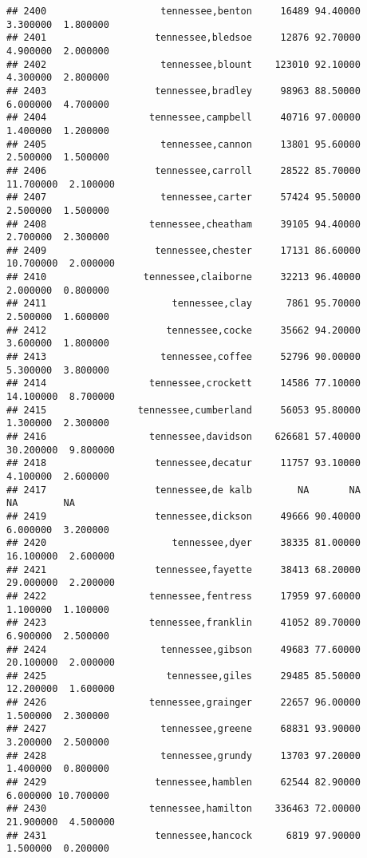 \documentclass[
]{article}
\begin{document}
\begin{verbatim}
## 2400                    tennessee,benton     16489 94.40000  3.300000  1.800000
## 2401                   tennessee,bledsoe     12876 92.70000  4.900000  2.000000
## 2402                    tennessee,blount    123010 92.10000  4.300000  2.800000
## 2403                   tennessee,bradley     98963 88.50000  6.000000  4.700000
## 2404                  tennessee,campbell     40716 97.00000  1.400000  1.200000
## 2405                    tennessee,cannon     13801 95.60000  2.500000  1.500000
## 2406                   tennessee,carroll     28522 85.70000 11.700000  2.100000
## 2407                    tennessee,carter     57424 95.50000  2.500000  1.500000
## 2408                  tennessee,cheatham     39105 94.40000  2.700000  2.300000
## 2409                   tennessee,chester     17131 86.60000 10.700000  2.000000
## 2410                 tennessee,claiborne     32213 96.40000  2.000000  0.800000
## 2411                      tennessee,clay      7861 95.70000  2.500000  1.600000
## 2412                     tennessee,cocke     35662 94.20000  3.600000  1.800000
## 2413                    tennessee,coffee     52796 90.00000  5.300000  3.800000
## 2414                  tennessee,crockett     14586 77.10000 14.100000  8.700000
## 2415                tennessee,cumberland     56053 95.80000  1.300000  2.300000
## 2416                  tennessee,davidson    626681 57.40000 30.200000  9.800000
## 2418                   tennessee,decatur     11757 93.10000  4.100000  2.600000
## 2417                   tennessee,de kalb        NA       NA        NA        NA
## 2419                   tennessee,dickson     49666 90.40000  6.000000  3.200000
## 2420                      tennessee,dyer     38335 81.00000 16.100000  2.600000
## 2421                   tennessee,fayette     38413 68.20000 29.000000  2.200000
## 2422                  tennessee,fentress     17959 97.60000  1.100000  1.100000
## 2423                  tennessee,franklin     41052 89.70000  6.900000  2.500000
## 2424                    tennessee,gibson     49683 77.60000 20.100000  2.000000
## 2425                     tennessee,giles     29485 85.50000 12.200000  1.600000
## 2426                  tennessee,grainger     22657 96.00000  1.500000  2.300000
## 2427                    tennessee,greene     68831 93.90000  3.200000  2.500000
## 2428                    tennessee,grundy     13703 97.20000  1.400000  0.800000
## 2429                   tennessee,hamblen     62544 82.90000  6.000000 10.700000
## 2430                  tennessee,hamilton    336463 72.00000 21.900000  4.500000
## 2431                   tennessee,hancock      6819 97.90000  1.500000  0.200000

\end{verbatim}
\end{document}
